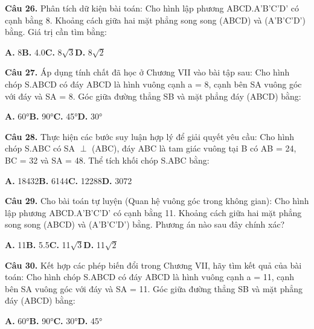 \documentclass[11pt,a4paper]{article}
\begin{document}
\textbf{\color{primary} Câu 26.} Phân tích dữ kiện bài toán: Cho hình lập phương ABCD.A'B'C'D' có cạnh bằng 8. Khoảng cách giữa hai mặt phẳng song song (ABCD) và (A'B'C'D') bằng. Giá trị cần tìm bằng:\par
\hspace*{1.5em}\textbf{A.} 8\quad\quad \textbf{B.} 4.0\quad\quad \textbf{C.} 8$\sqrt{3}$\quad\quad \textbf{D.} 8$\sqrt{2}$\par\vspace{2pt}
\textbf{\color{primary} Câu 27.} Áp dụng tính chất đã học ở Chương VII vào bài tập sau: Cho hình chóp S.ABCD có đáy ABCD là hình vuông cạnh a = 8, cạnh bên SA vuông góc với đáy và SA = 8. Góc giữa đường thẳng SB và mặt phẳng đáy (ABCD) bằng:\par
\hspace*{1.5em}\textbf{A.} 60°\quad\quad \textbf{B.} 90°\quad\quad \textbf{C.} 45°\quad\quad \textbf{D.} 30°\par\vspace{2pt}
\textbf{\color{primary} Câu 28.} Thực hiện các bước suy luận hợp lý để giải quyết yêu cầu: Cho hình chóp S.ABC có SA $\perp$ (ABC), đáy ABC là tam giác vuông tại B có AB = 24, BC = 32 và SA = 48. Thể tích khối chóp S.ABC bằng:\par
\hspace*{1.5em}\textbf{A.} 18432\quad\quad \textbf{B.} 6144\quad\quad \textbf{C.} 12288\quad\quad \textbf{D.} 3072\par\vspace{2pt}
\textbf{\color{primary} Câu 29.} Cho bài toán tự luyện (Quan hệ vuông góc trong không gian): Cho hình lập phương ABCD.A'B'C'D' có cạnh bằng 11. Khoảng cách giữa hai mặt phẳng song song (ABCD) và (A'B'C'D') bằng. Phương án nào sau đây chính xác?\par
\hspace*{1.5em}\textbf{A.} 11\quad\quad \textbf{B.} 5.5\quad\quad \textbf{C.} 11$\sqrt{3}$\quad\quad \textbf{D.} 11$\sqrt{2}$\par\vspace{2pt}
\textbf{\color{primary} Câu 30.} Kết hợp các phép biến đổi trong Chương VII, hãy tìm kết quả của bài toán: Cho hình chóp S.ABCD có đáy ABCD là hình vuông cạnh a = 11, cạnh bên SA vuông góc với đáy và SA = 11. Góc giữa đường thẳng SB và mặt phẳng đáy (ABCD) bằng:\par
\hspace*{1.5em}\textbf{A.} 60°\quad\quad \textbf{B.} 90°\quad\quad \textbf{C.} 30°\quad\quad \textbf{D.} 45°\par\vspace{2pt}
\end{document}
